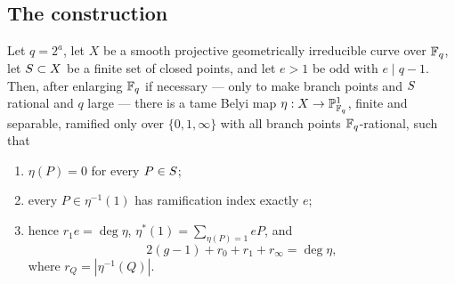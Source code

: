 \subsection{The construction}
\label{sec:belyi}

\begin{lemma}
\label{lem:belyi}
Let $q = 2^a$, let $X$ be a smooth projective geometrically irreducible
curve over $\mathbb{F}_q$, let $S \subset X$ be a finite set of closed points,
and let $e > 1$ be odd with $e \mid q-1$. Then, after enlarging $\mathbb{F}_q$ if
necessary --- only to make branch points and $S$ rational and $q$ large
--- there is a tame Belyi map $\eta : X \to \mathbb{P}^1_{\mathbb{F}_q}$, finite and
separable, ramified only over $\{0,1,\infty\}$ with all branch points
$\mathbb{F}_q$-rational, such that
\begin{enumerate}[label=\textup{(\arabic*)},leftmargin=*,itemsep=1pt]
\item $\eta(P) = 0$ for every $P \in S$;
\item every $P \in \eta^{-1}(1)$ has ramification index exactly $e$;
\item hence $r_1 e = \deg \eta$, $\eta^*(1) = \sum_{\eta(P)=1} eP$, and
  \begin{equation}
  \label{eq:rh}
    2(g-1) + r_0 + r_1 + r_\infty = \deg \eta ,
  \end{equation}
  where $r_Q = |\eta^{-1}(Q)|$.
\end{enumerate}
\end{lemma}

